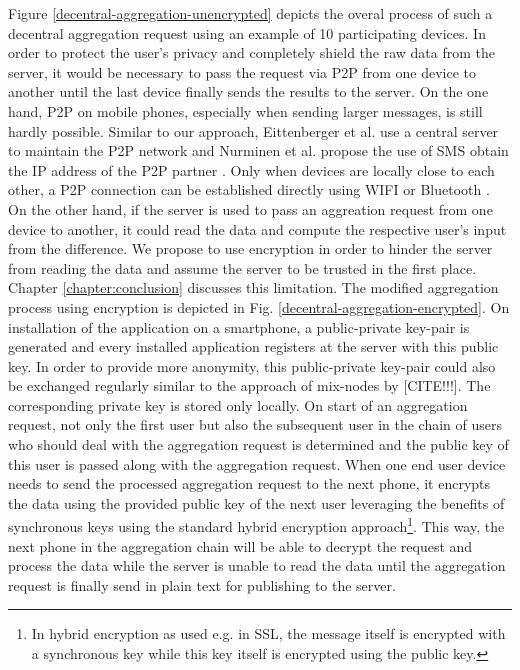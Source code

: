 Figure \ref{decentral-aggregation-unencrypted} depicts the overal process of such a decentral aggregation request using an example of 10 participating devices.
In order to protect the user's privacy and completely shield the raw data from the server, it would be necessary to pass the request via P2P from one device to another until the last device finally sends the results to the server. On the one hand, P2P on mobile phones, especially when sending larger messages, is still hardly possible. Similar to our approach, Eittenberger et al. \parencite{eittenberger2012rapidstream} use a central server to maintain the P2P network and Nurminen et al. propose the use of SMS obtain the IP address of the P2P partner \parencite{nurminen2006p2p}. Only when devices are locally close to each other, a P2P connection can be established directly using WIFI or Bluetooth \parencite{p2p-android}. On the other hand, if the server is used to pass an aggreation request from one device to another, it could read the data and compute the respective user's input from the difference. We propose to use encryption in order to hinder the server from reading the data and assume the server to be trusted in the first place. Chapter \ref{chapter:conclusion} discusses this limitation. The modified aggregation process using encryption is depicted in Fig. \ref{decentral-aggregation-encrypted}. On installation of the application on a smartphone, a public-private key-pair is generated and every installed application registers at the server with this public key. In order to provide more anonymity, this public-private key-pair could also be exchanged regularly similar to the approach of mix-nodes by [CITE!!!]. The corresponding private key is stored only locally. On start of an aggregation request, not only the first user but also the subsequent user in the chain of users who should deal with the aggregation request is determined and the public key of this user is passed along with the aggregation request. When one end user device needs to send the processed aggregation request to the next phone, it encrypts the data using the provided public key of the next user leveraging the benefits of synchronous keys using the standard hybrid encryption approach\footnote{In hybrid encryption as used e.g. in SSL, the message itself is encrypted with a synchronous key while this key itself is encrypted using the public key.}. This way, the next phone in the aggregation chain will be able to decrypt the request and process the data while the server is unable to read the data until the aggregation request is finally send in plain text for publishing to the server. 

